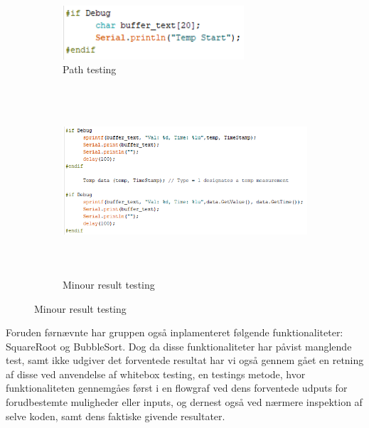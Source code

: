 \documentclass[11pt]{article}
\begin{document}
    \begin{figure}[H]
        \begin{subfigure}{0.3\textwidth}
            \centering
            \includegraphics[width=1\linewidth, height=2cm]{Struktureret_System_Udvikling/Workshop_3/Assets/Start.PNG}
            \caption{Path testing}
            \label{fig:TestPath}
        \end{subfigure}
        \begin{subfigure}{0.7\textwidth}
            \centering
            \includegraphics[width=1\linewidth, height=7cm]{Struktureret_System_Udvikling/Workshop_3/Assets/Secound.PNG}
            \caption{Minour result testing}
            \label{fig:TestRes}
        \end{subfigure}
        \label{fig:Testing}
    \end{figure}
    
    
    \noindent
    Foruden førnævnte har gruppen også inplamenteret følgende funktionaliteter:
    SquareRoot og BubbleSort.
    Dog da disse funktionaliteter har påvist manglende test, samt ikke udgiver det forventede resultat har vi også gennem gået en retning af disse ved anvendelse af whitebox testing, en testings metode, hvor funktionaliteten gennemgåes først i en flowgraf ved dens forventede udputs for forudbestemte muligheder eller inputs, og dernest også ved nærmere inspektion af selve koden, samt dens faktiske givende resultater.
    
\end{document}
